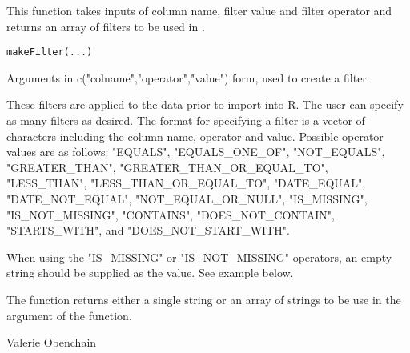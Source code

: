 \begin{Description}\relax
This function takes inputs of column name, filter value and filter operator and 
returns an array of filters to be used in .
\end{Description}
\begin{Usage}
\begin{verbatim}
makeFilter(...)
\end{verbatim}
\end{Usage}
\begin{Arguments}
\begin{ldescription}
\item[\code{...}] Arguments in c("colname","operator","value") form, used to create a filter.
\end{ldescription}
\end{Arguments}
\begin{Details}\relax
These filters are applied to the data prior to import into R. The user can specify as many 
filters as desired. The format for specifying a filter is a vector of characters including
the column name, operator and value.
Possible operator values are as follows:
"EQUALS", "EQUALS\_ONE\_OF", "NOT\_EQUALS", "GREATER\_THAN", "GREATER\_THAN\_OR\_EQUAL\_TO", 
"LESS\_THAN", "LESS\_THAN\_OR\_EQUAL\_TO", "DATE\_EQUAL", "DATE\_NOT\_EQUAL", 
"NOT\_EQUAL\_OR\_NULL", "IS\_MISSING", "IS\_NOT\_MISSING", "CONTAINS", "DOES\_NOT\_CONTAIN", 
"STARTS\_WITH", and "DOES\_NOT\_START\_WITH".

When using the "IS\_MISSING" or "IS\_NOT\_MISSING" operators, an empty string should be supplied as the value.
See example below.
\end{Details}
\begin{Value}
The function returns either a single string or an array of strings to be use in the
 argument of the  function.
\end{Value}
\begin{Author}\relax
Valerie Obenchain
\end{Author}
